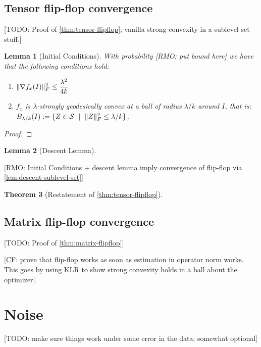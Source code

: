\documentclass{article}
\newtheorem{theorem}{Theorem}
\newtheorem{lemma}[theorem]{Lemma}
\DeclarePairedDelimiter{\norm}{\lVert}{\rVert}
\newcommand\Sym{\mathcal{S}}
\newcommand{\CF}[1]{{\color{purple}[CF: #1]}}
\newcommand{\RMO}[1]{{\color{red}[RMO: #1]}}
\newcommand{\TODO}[1]{{\color{blue}[TODO: #1]}}
\begin{document}
\subsection{Tensor flip-flop convergence}


\TODO{Proof of \cref{thm:tensor-flipflop}; vanilla strong convexity in a sublevel set stuff.}

\begin{lemma}[Initial Conditions]
	With probability \RMO{put bound here} we have that the following conditions hold:
	\begin{enumerate}
		\item $\norm{\nabla f_x(I)}_F^2 \leq \dfrac{\lambda^2}{4 k}$
		\item $f_x$ is $\lambda$-strongly geodesically convex at a ball of radius $\lambda/k$ around $I$, that is: $B_{\lambda/k}(I) := \{ Z \in \Sym \ \mid \ \norm{Z}_F^2 \leq \lambda/k \}$.
	\end{enumerate}
\end{lemma}

\begin{proof}
	
\end{proof}

\begin{lemma}[Descent Lemma]

\end{lemma}

\RMO{Initial Conditions + descent lemma imply convergence of flip-flop via \cref{lem:descent-sublevel-set}}

\begin{theorem}[Restatement of \cref{thm:tensor-flipflop}]

\end{theorem}

\subsection{Matrix flip-flop convergence}


\TODO{Proof of \cref{thm:matrix-flipflop}}


\CF{prove that flip-flop works as soon as estimation in operator norm works. This goes by using KLR to show strong convexity holds in a ball about the optimizer}.






\section{Noise}
\TODO{make sure things work under some error in the data; somewhat optional}
\end{document}
